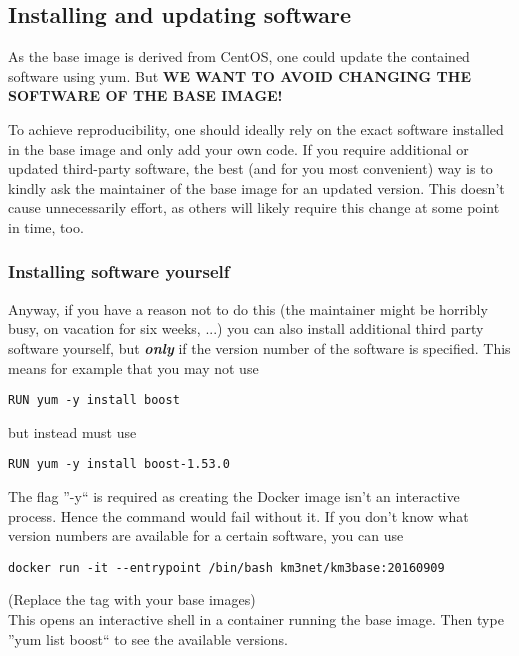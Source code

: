 \documentclass[a4paper, twoside, 11pt]{article}
\begin{document}
\subsection{Installing and updating software}
\label{sec:installSoftware}
As the base image is derived from CentOS, one could update the contained software using yum. 
But \textbf{WE WANT TO AVOID CHANGING THE SOFTWARE OF THE BASE IMAGE!}

To achieve reproducibility, one should ideally rely on the exact software installed in the base image and only add your own code. 
If you require additional or updated third-party software, the best (and for you most convenient) way 
is to kindly ask the maintainer of the base image for an updated version. 
This doesn't cause unnecessarily effort, 
as others will likely require this change at some point in time, too. 

\subsubsection{Installing software yourself}
Anyway, if you have a reason not to do this (the maintainer might be horribly busy, on vacation for six weeks, ...) 
you can also install additional third party software yourself, 
but \textbf{\textit{only}} if the version number of the software is specified. 
This means for example that you may not use 
\begin{lstlisting}[basicstyle=\ttfamily\small,upquote=true,columns=flexible,keepspaces=true,frame=single]
RUN yum -y install boost 
\end{lstlisting}
but instead must use 
\begin{lstlisting}[basicstyle=\ttfamily\small,upquote=true,columns=flexible,keepspaces=true,frame=single]
RUN yum -y install boost-1.53.0
\end{lstlisting}
The flag ''-y`` is required as creating the Docker image isn't an interactive process. 
Hence the command would fail without it. 
If you don't know what version numbers are available for a certain software, you can use 
\begin{lstlisting}[basicstyle=\ttfamily\small,upquote=true,columns=flexible,keepspaces=true,frame=single]
docker run -it --entrypoint /bin/bash km3net/km3base:20160909
\end{lstlisting}
(Replace the tag with your base images) \\
This opens an interactive shell in a container running the base image. 
Then type ''yum list boost`` to see the available versions. 
\end{document}

